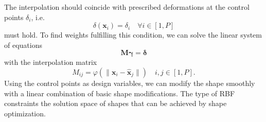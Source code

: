 The interpolation should coincide with prescribed deformations at the control points $\delta_i$, i.e. 
\begin{equation}
    \delta(\mathbf{x}_i) = \delta_i \quad \forall i \in [1, P]
\end{equation}
must hold. To find weights fulfilling this condition, we can solve the linear system of equations 
\begin{equation}
    \mathbf{M} \pmb{\gamma} = \pmb{\delta} 
\end{equation}
with the interpolation matrix 
\begin{equation}
    M_{ij} = \varphi(\lVert \mathbf{x}_i-\hat{\mathbf{x}}_j \rVert) \quad i,j \in [1, P]. 
\end{equation}
Using the control points as design variables, we can modify the shape smoothly with a linear combination of basic shape modifications. The type of RBF constraints the solution space of shapes that can be achieved by shape optimization. 

